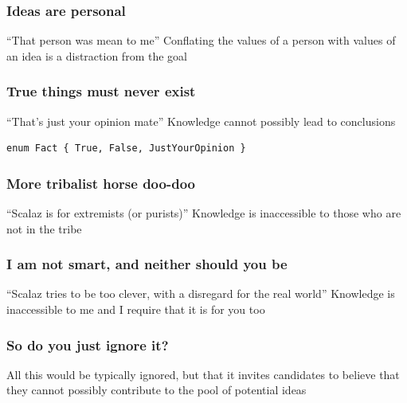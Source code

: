 \begin{frame}
\frametitle{Ideas are personal}
\begin{block}{``That person was mean to me''}
Conflating the values of a person with values of an idea is a distraction from the goal
\end{block}
\end{frame}


\begin{frame}[fragile]
\frametitle{True things must never exist}
\begin{block}{``That's just your opinion mate''}
Knowledge cannot possibly lead to conclusions
\end{block}
\begin{lstlisting}[style=java]
enum Fact { True, False, JustYourOpinion }
\end{lstlisting}
\end{frame}


\begin{frame}
\frametitle{More tribalist horse doo-doo}
\begin{block}{``Scalaz is for extremists (or purists)''}
Knowledge is inaccessible to those who are not in the tribe
\end{block}
\end{frame}


\begin{frame}
\frametitle{I am not smart, and neither should you be}
\begin{block}{``Scalaz tries to be too clever, with a disregard for the real world''}
Knowledge is inaccessible to me and I require that it is for you too
\end{block}
\end{frame}


\begin{frame}
\frametitle{So do you just ignore it?}
\begin{block}{All this would be typically ignored, but that}
it invites candidates to believe that they cannot possibly contribute to the pool of potential ideas
\end{block}
\end{frame}
